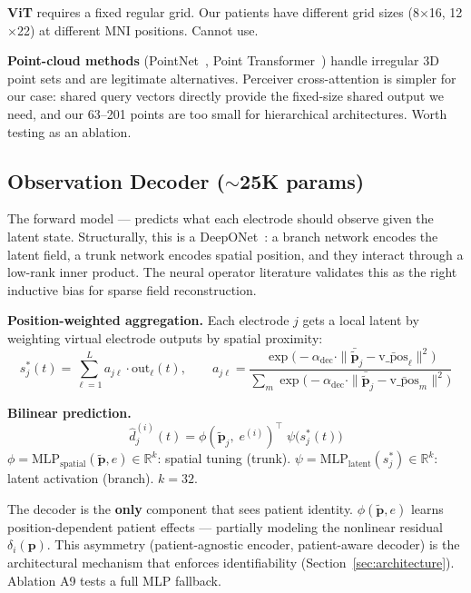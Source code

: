 \documentclass[11pt,letterpaper]{article}
\newcommand{\bfp}{\mathbf{p}}
\newcommand{\R}{\mathbb{R}}
\begin{document}
\textbf{ViT} requires a fixed regular grid. Our patients have different grid sizes (8$\times$16, 12$\times$22) at different MNI positions. Cannot use.

\textbf{Point-cloud methods} (PointNet~\cite{qi2017}, Point Transformer~\cite{zhao2021}) handle irregular 3D point sets and are legitimate alternatives. Perceiver cross-attention is simpler for our case: shared query vectors directly provide the fixed-size shared output we need, and our 63--201 points are too small for hierarchical architectures. Worth testing as an ablation.


\subsection{Observation Decoder (${\sim}$25K params)}\label{sec:obs-decoder}

The forward model --- predicts what each electrode should observe given the latent state. Structurally, this is a DeepONet~\cite{lu2021}: a branch network encodes the latent field, a trunk network encodes spatial position, and they interact through a low-rank inner product. The neural operator literature validates this as the right inductive bias for sparse field reconstruction.

\textbf{Position-weighted aggregation.} Each electrode $j$ gets a local latent by weighting virtual electrode outputs by spatial proximity:
\begin{equation}
s_j^*(t) = \sum_{\ell=1}^{L} a_{j\ell} \cdot \text{out}_\ell(t), \qquad
a_{j\ell} = \frac{\exp\bigl(-\alpha_{\text{dec}} \cdot \|\bar{\tilde{\bfp}}_j - \bar{\text{v\_pos}}_\ell\|^2\bigr)}
             {\sum_{m} \exp\bigl(-\alpha_{\text{dec}} \cdot \|\bar{\tilde{\bfp}}_j - \bar{\text{v\_pos}}_m\|^2\bigr)}
\end{equation}

\textbf{Bilinear prediction.}
\begin{equation}\label{eq:bilinear}
\hat{d}_j^{(i)}(t) = \phi(\tilde{\bfp}_j,\; e^{(i)})^\top \;\psi\bigl(s_j^*(t)\bigr)
\end{equation}
$\phi = \text{MLP}_{\text{spatial}}(\tilde{\bfp}, e) \in \R^k$: spatial tuning (trunk). $\psi = \text{MLP}_{\text{latent}}(s_j^*) \in \R^k$: latent activation (branch). $k{=}32$.

The decoder is the \textbf{only} component that sees patient identity. $\phi(\tilde{\bfp}, e)$ learns position-dependent patient effects --- partially modeling the nonlinear residual $\delta_i(\bfp)$. This asymmetry (patient-agnostic encoder, patient-aware decoder) is the architectural mechanism that enforces identifiability (Section~\ref{sec:architecture}). Ablation A9 tests a full MLP fallback.
\end{document}
